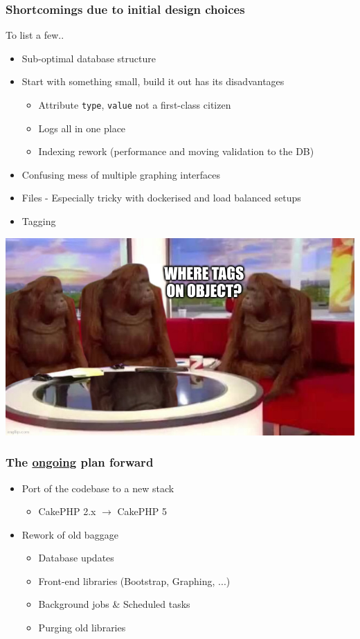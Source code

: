 \begin{frame}
    \frametitle{Shortcomings due to initial design choices}
    To list a few..
    \begin{itemize}
        \item Sub-optimal database structure
        \item Start with something small, build it out has its disadvantages
        \begin{itemize}
            \item Attribute \texttt{type}, \texttt{value} not a first-class citizen
            \item Logs all in one place
            \item Indexing rework (performance and moving validation to the DB)
        \end{itemize}
        \item Confusing mess of multiple graphing interfaces
        \item Files - Especially tricky with dockerised and load balanced setups
        \item Tagging
    \end{itemize}
    \begin{center}
        \includegraphics[width=0.5\linewidth]{pictures/where-tags-objects.jpeg}
    \end{center}
\end{frame}

\begin{frame}
    \frametitle{The \underline{ongoing} plan forward}
    \begin{itemize}
        \item Port of the codebase to a new stack
        \begin{itemize}
            \item CakePHP 2.x $\rightarrow$ CakePHP 5
        \end{itemize}
        \item Rework of old baggage
        \begin{itemize}
            \item Database updates
            \item Front-end libraries (Bootstrap, Graphing, ...)
            \item Background jobs \& Scheduled tasks
            \item Purging old libraries
        \end{itemize}
    \end{itemize}
\end{frame}

